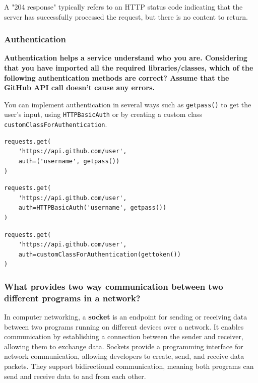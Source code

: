 A "204 response" typically refers to an HTTP status code indicating that the server has successfully processed the request, but there is no content to return.

\subsubsection{Authentication}
\textbf{Authentication helps a service understand who you are. Considering that you have imported all the required libraries/classes, which of the following authentication methods are correct? Assume that the GitHub API call doesn’t cause any errors.}

You can implement authentication in several ways such as \texttt{getpass()} to get the user’s input, using \texttt{HTTPBasicAuth} or by creating a custom class \texttt{customClassForAuthentication}. 
\begin{codebox}
\begin{verbatim}
requests.get(
    'https://api.github.com/user',
    auth=('username', getpass())
)
\end{verbatim}
\end{codebox}

\begin{codebox}
\begin{verbatim}
requests.get(
    'https://api.github.com/user',
    auth=HTTPBasicAuth('username', getpass())
)
\end{verbatim}
\end{codebox}

\begin{codebox}
\begin{verbatim}
requests.get(
    'https://api.github.com/user',
    auth=customClassForAuthentication(gettoken())
)
\end{verbatim}
\end{codebox}

\subsubsection{What provides two way communication between two different programs in a network?}
In computer networking, a \textbf{socket} is an endpoint for sending or receiving data between two programs running on different devices over a network. It enables communication by establishing a connection between the sender and receiver, allowing them to exchange data. Sockets provide a programming interface for network communication, allowing developers to create, send, and receive data packets. They support bidirectional communication, meaning both programs can send and receive data to and from each other.

